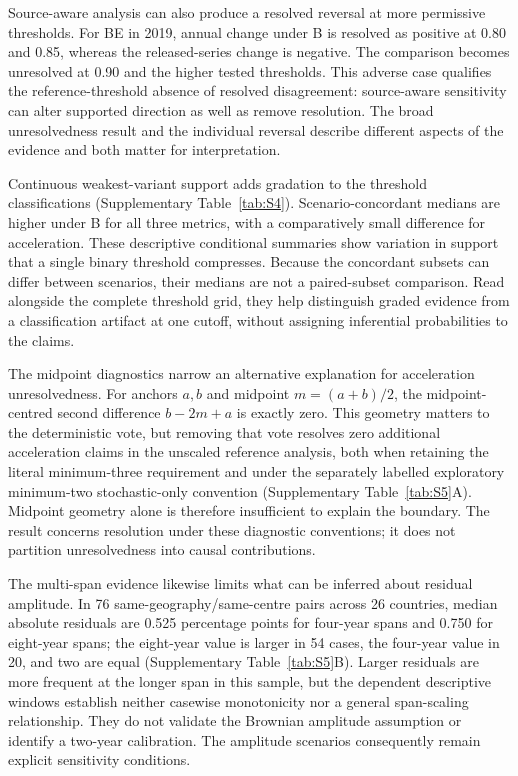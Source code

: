Source-aware analysis can also produce a resolved reversal at more permissive thresholds. For BE in 2019, annual change under B is resolved as positive at 0.80 and 0.85, whereas the released-series change is negative. The comparison becomes unresolved at 0.90 and the higher tested thresholds. This adverse case qualifies the reference-threshold absence of resolved disagreement: source-aware sensitivity can alter supported direction as well as remove resolution. The broad unresolvedness result and the individual reversal describe different aspects of the evidence and both matter for interpretation.

Continuous weakest-variant support adds gradation to the threshold classifications (Supplementary Table~\ref{tab:S4}). Scenario-concordant medians are higher under B for all three metrics, with a comparatively small difference for acceleration. These descriptive conditional summaries show variation in support that a single binary threshold compresses. Because the concordant subsets can differ between scenarios, their medians are not a paired-subset comparison. Read alongside the complete threshold grid, they help distinguish graded evidence from a classification artifact at one cutoff, without assigning inferential probabilities to the claims.

The midpoint diagnostics narrow an alternative explanation for acceleration unresolvedness. For anchors $a,b$ and midpoint $m=(a+b)/2$, the midpoint-centred second difference $b-2m+a$ is exactly zero. This geometry matters to the deterministic vote, but removing that vote resolves zero additional acceleration claims in the unscaled reference analysis, both when retaining the literal minimum-three requirement and under the separately labelled exploratory minimum-two stochastic-only convention (Supplementary Table~\ref{tab:S5}A). Midpoint geometry alone is therefore insufficient to explain the boundary. The result concerns resolution under these diagnostic conventions; it does not partition unresolvedness into causal contributions.

The multi-span evidence likewise limits what can be inferred about residual amplitude. In 76 same-geography/same-centre pairs across 26 countries, median absolute residuals are 0.525 percentage points for four-year spans and 0.750 for eight-year spans; the eight-year value is larger in 54 cases, the four-year value in 20, and two are equal (Supplementary Table~\ref{tab:S5}B). Larger residuals are more frequent at the longer span in this sample, but the dependent descriptive windows establish neither casewise monotonicity nor a general span-scaling relationship. They do not validate the Brownian amplitude assumption or identify a two-year calibration. The amplitude scenarios consequently remain explicit sensitivity conditions.

